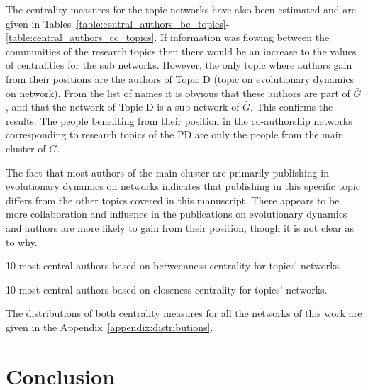 \documentclass{article}
\theoremstyle{definition}
\begin{document}
The centrality measures for the topic networks have also been estimated and are
given in
Tables~\ref{table:central_authors_bc_topics}-\ref{table:central_authors_cc_topics}.
If information was flowing between the communities of the research topics then
there would be an increase to the values of centralities for the sub networks.
However, the only topic where authors gain from their positions are the authors
of Topic D (topic on evolutionary dynamics on network). From the list of names it is obvious that these authors are
part of \(\bar{G}\), and that the network of Topic D is a sub network of \(\bar{G}\).
This confirms the results. The people benefiting from their position in the co-authorship networks
corresponding to research topics of the PD are only the people from the main
cluster of \(G\).

The fact that most authors of the main cluster are primarily publishing in
evolutionary dynamics on networks indicates that publishing in this specific
topic differs from the other topics covered in this manuscript. There appears to
be more collaboration and influence in the publications on evolutionary
dynamics and authors are more likely to gain from their position,
though it is not clear as to why.

\begin{table}[!hbtp]
    \begin{center}
    \resizebox{.9\textwidth}{!}{}
\end{center}
\caption{10 most central authors based on betweenness centrality
for topics' networks.}\label{table:central_authors_bc_topics}
\end{table}

\begin{table}[!hbtp]
    \begin{center}
    \resizebox{.9\textwidth}{!}{}
\end{center}
\caption{10 most central authors based on closeness centrality
for topics' networks.}\label{table:central_authors_cc_topics}
\end{table}

The distributions of both centrality measures for all the networks of this
work are given in the Appendix~\ref{appendix:distributions}.

\section{Conclusion}\label{section:conclusion}
\end{document}
